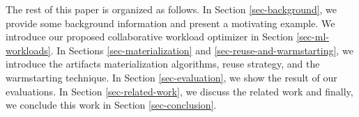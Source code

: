 The rest of this paper is organized as follows.
In Section \ref{sec-background}, we provide some background information and present a motivating example.
We introduce our proposed collaborative workload optimizer in Section \ref{sec-ml-workloads}.
In Sections \ref{sec-materialization} and \ref{sec-reuse-and-warmstarting}, we introduce the artifacts materialization algorithms, reuse strategy, and the warmstarting technique. 
In Section \ref{sec-evaluation}, we show the result of our evaluations.
In Section \ref{sec-related-work}, we discuss the related work and finally, we conclude this work in Section \ref{sec-conclusion}.
